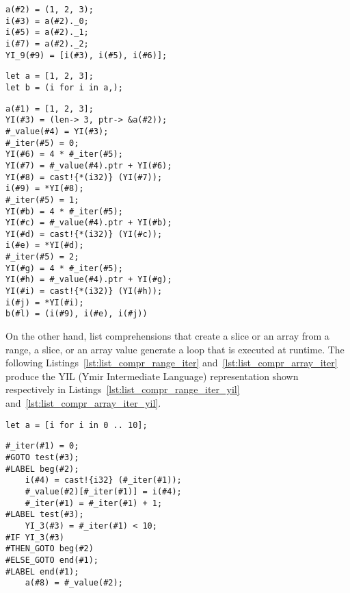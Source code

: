 \begin{lstlisting}[style=intermediateVerb, label=lst:list_compr_tuple_iter_yil, caption=YIL representation of Listing~\ref{lst:list_compr_tuple_iter}]
a(#2) = (1, 2, 3);
i(#3) = a(#2)._0;
i(#5) = a(#2)._1;
i(#7) = a(#2)._2;
YI_9(#9) = [i(#3), i(#5), i(#6)];
\end{lstlisting}

\begin{lstlisting}[style=coloredverbatim, label=lst:list_compr_tuple_create, caption=List comprehension iterating over a tuple]
let a = [1, 2, 3];
let b = (i for i in a,);
\end{lstlisting}

\begin{lstlisting}[style=intermediateVerb, label=lst:list_compr_tuple_create_yil, caption=YIL representation of Listing~\ref{lst:list_compr_tuple_iter}]
a(#1) = [1, 2, 3];
YI(#3) = (len-> 3, ptr-> &a(#2));
#_value(#4) = YI(#3);
#_iter(#5) = 0;
YI(#6) = 4 * #_iter(#5);
YI(#7) = #_value(#4).ptr + YI(#6);
YI(#8) = cast!{*(i32)} (YI(#7));
i(#9) = *YI(#8);
#_iter(#5) = 1;
YI(#b) = 4 * #_iter(#5);
YI(#c) = #_value(#4).ptr + YI(#b);
YI(#d) = cast!{*(i32)} (YI(#c));
i(#e) = *YI(#d);
#_iter(#5) = 2;
YI(#g) = 4 * #_iter(#5);
YI(#h) = #_value(#4).ptr + YI(#g);
YI(#i) = cast!{*(i32)} (YI(#h));
i(#j) = *YI(#i);
b(#l) = (i(#9), i(#e), i(#j))
\end{lstlisting}

On the other hand, list comprehensions that create a slice or an array from a
range, a slice, or an array value generate a loop that is executed at runtime.
The following Listings~\ref{lst:list_compr_range_iter}
and~\ref{lst:list_compr_array_iter} produce the YIL (Ymir Intermediate Language)
representation shown respectively in
Listings~\ref{lst:list_compr_range_iter_yil}
and~\ref{lst:list_compr_array_iter_yil}.

\begin{lstlisting}[style=coloredverbatim, label=lst:list_compr_range_iter, caption=List comprehension iterating over a range]
let a = [i for i in 0 .. 10];
\end{lstlisting}

\begin{lstlisting}[style=intermediateVerb, label=lst:list_compr_range_iter_yil, caption=YIL representation of Listing~\ref{lst:list_compr_range_iter}]
    #_iter(#1) = 0;
#GOTO test(#3);
#LABEL beg(#2);
    i(#4) = cast!{i32} (#_iter(#1));
    #_value(#2)[#_iter(#1)] = i(#4);
    #_iter(#1) = #_iter(#1) + 1;
#LABEL test(#3);
    YI_3(#3) = #_iter(#1) < 10;
#IF YI_3(#3)
#THEN_GOTO beg(#2)
#ELSE_GOTO end(#1);
#LABEL end(#1);
    a(#8) = #_value(#2);
\end{lstlisting}

